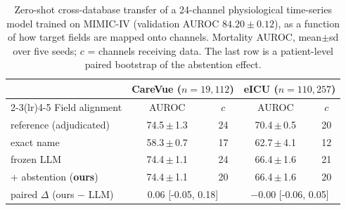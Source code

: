 \begin{table}[t]
\centering
\caption{Zero-shot cross-database transfer of a 24-channel physiological time-series model trained on MIMIC-IV (validation AUROC $84.20\pm0.12$), as a function of how target fields are mapped onto channels. Mortality AUROC, mean$\pm$sd over five seeds; $c$ = channels receiving data. The last row is a patient-level paired bootstrap of the abstention effect.}
\label{tab:transfer}
\scriptsize
\setlength{\tabcolsep}{3pt}
\begin{tabular}{@{}l cc cc@{}}
\toprule
& \multicolumn{2}{c}{CareVue ($n{=}19{,}112$)} & \multicolumn{2}{c}{eICU ($n{=}110{,}257$)} \\
\cmidrule(lr){2-3}\cmidrule(lr){4-5}
Field alignment & AUROC & $c$ & AUROC & $c$ \\
\midrule
reference (adjudicated) & 74.5\,$\pm$\,1.3 & 24 & 70.4\,$\pm$\,0.5 & 20 \\
exact name & 58.3\,$\pm$\,0.7 & 17 & 62.7\,$\pm$\,4.1 & 12 \\
frozen LLM & 74.4\,$\pm$\,1.1 & 24 & 66.4\,$\pm$\,1.6 & 21 \\
\quad + abstention (\textbf{ours}) & 74.4\,$\pm$\,1.1 & 20 & 66.4\,$\pm$\,1.6 & 20 \\
\midrule
paired $\Delta$ (ours $-$ LLM) & \multicolumn{2}{c}{$0.06$ [-0.05, 0.18]} & \multicolumn{2}{c}{$-0.00$ [-0.06, 0.05]} \\
\bottomrule
\end{tabular}
\vspace{-4pt}
\end{table}
